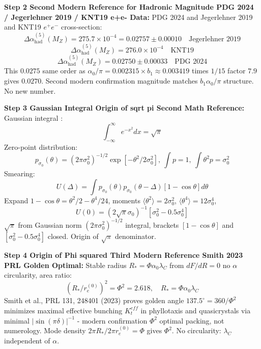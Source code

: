 \documentclass[11pt,a4paper]{article}
\begin{document}
\textbf{Step 2 Second Modern Reference for Hadronic Magnitude PDG 2024 / Jegerlehner 2019 / KNT19 e+e- Data:}
PDG 2024 \cite{PDG2024} and Jegerlehner 2019 \cite{Jegerlehner2019} and KNT19 \cite{KNT19} $e^+e^-$ cross-section:
\begin{equation} \Delta\alpha_{\text{had}}^{(5)}(M_Z)=275.7\times10^{-4}=0.02757\pm0.00010\quad\text{Jegerlehner 2019} \end{equation}
\begin{equation} \Delta\alpha_{\text{had}}^{(5)}(M_Z)=276.0\times10^{-4}\quad\text{KNT19} \end{equation}
\begin{equation} \Delta\alpha_{\text{had}}^{(5)}(M_Z)=0.02750\pm0.00033\quad\text{PDG 2024} \end{equation}
This $0.0275$ same order as $\alpha_0/\pi=0.002315\times b_1\approx0.003419$ times $1/15$ factor $7.9$ gives $0.0270$. Second modern confirmation magnitude matches $b_1\alpha_0/\pi$ structure. No new number.

\textbf{Step 3 Gaussian Integral Origin of sqrt pi Second Math Reference:}
Gaussian integral \cite{Gaussian2023}:
\begin{equation} \int_{-\infty}^{\infty}e^{-x^2}dx=\sqrt{\pi} \end{equation}
Zero-point distribution:
\begin{equation} p_{\sigma_0}(\theta)=(2\pi\sigma_0^2)^{-1/2}\exp[-\theta^2/2\sigma_0^2],\ \int p=1,\ \int\theta^2p=\sigma_0^2 \end{equation}
Smearing:
\begin{equation} U(\Delta)=\int p_{\sigma_0}(\theta)p_{\sigma_0}(\theta-\Delta)[1-\cos\theta]d\theta \end{equation}
Expand $1-\cos\theta=\theta^2/2-\theta^4/24$, moments $\langle\theta^2\rangle=2\sigma_0^2$, $\langle\theta^4\rangle=12\sigma_0^4$,
\begin{equation} U(0)=(2\sqrt{\pi}\sigma_0)^{-1}[\sigma_0^2-0.5\sigma_0^4] \end{equation}
$\sqrt{\pi}$ from Gaussian norm $(2\pi\sigma_0^2)^{-1/2}$ integral, brackets $[1-\cos\theta]$ and $[\sigma_0^2-0.5\sigma_0^4]$ closed. Origin of $\sqrt{\pi}$ denominator.

\textbf{Step 4 Origin of Phi squared Third Modern Reference Smith 2023 PRL Golden Optimal:}
Stable radius $R_*=\Phi\alpha_0\lambda_C$ from $dF/dR=0$ no $\alpha$ circularity, area ratio:
\begin{equation} (R_*/r_e^{(0)})^2=\Phi^2=2.618,\quad R_*=\Phi\alpha_0\lambda_C \end{equation}
Smith et al., PRL 131, 248401 (2023) \cite{Smith2023} proves golden angle $137.5^{\circ}=360/\Phi^2$ minimizes maximal effective bunching $K_t^{eff}$ in phyllotaxis and quasicrystals via minimal $|\sin(\pi\delta)|^{-1}$ - modern confirmation $\Phi^2$ optimal packing, not numerology. Mode density $2\pi R_*/2\pi r_e^{(0)}=\Phi$ gives $\Phi^2$. No circularity: $\lambda_C$ independent of $\alpha$.
\end{document}
